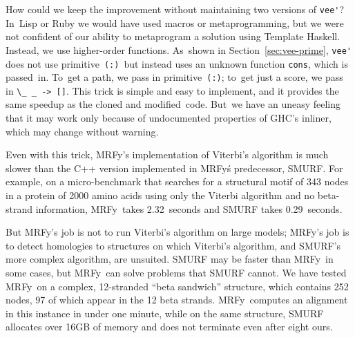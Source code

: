 \documentclass[preprint,nonatbib,blockstyle,times]{sigplanconf}
\newcommand\mrfy{MRFy} %
\newcommand\primcons{\texttt{\small(:)}}
\newcommand\secref[1]{Section~\ref{sec:#1}}
\begin{document}
How could we keep the improvement without 
maintaining two versions of \verb+vee'+?
In~Lisp or Ruby we would have used macros or metaprogramming,
but we were not confident of our ability to metaprogram a solution
using Template Haskell.
Instead, we use higher-order functions.
As~shown in \secref{vee-prime},
\verb+vee'+ does not use primitive~\primcons\ but instead
uses an unknown function \texttt{cons}, which is
passed~in.
To~get a path, we pass in primitive~\primcons;
to~get just a score, we pass in
\verb+\_ _ -> []+.
This trick is simple and easy to implement, and it provides the same
speedup as the cloned and modified~code.
But~we have an uneasy feeling that it may work only because of
undocumented properties of GHC's inliner, which may 
change without warning. 

Even with this trick,
MRFy's implementation of Viterbi's algorithm is much
slower than the C++ version implemented in \mrfy\'s predecessor,
SMURF.
For example, on a micro-benchmark that searches for a
structural motif of 343 nodes in a protein of 2000 amino acids
using only the Viterbi algorithm and no beta-strand information,
\mrfy\ takes 2.32~seconds and
SMURF takes 0.29~seconds.

But \mrfy's job is not to run Viterbi's algorithm on large models;
\mrfy's job is to detect homologies to structures on which Viterbi's
algorithm, and SMURF's more complex algorithm, are unsuited.
SMURF may be faster than \mrfy\ in some cases,
but \mrfy\ can solve problems that SMURF cannot.
We have tested \mrfy\ on a complex, 12-stranded ``beta sandwich''
structure, which contains 252 nodes,
97 of which appear in the 12 beta strands.
\mrfy\ computes an alignment in this instance in under one minute,
while on the same structure, SMURF allocates
over 16GB of memory and does not terminate even after eight ours.
\end{document}
